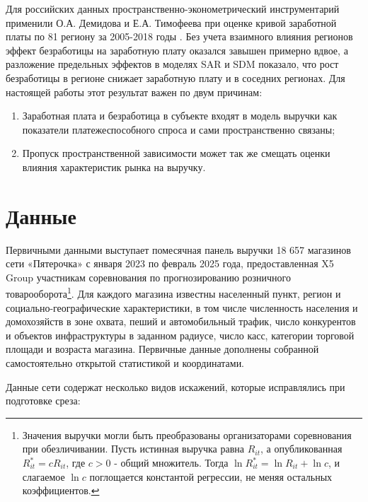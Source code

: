 \documentclass[12pt, a4paper]{article}
\begin{document}
Для российских данных пространственно-эконометрический инструментарий применили О.А. Демидова и
Е.А. Тимофеева при оценке кривой заработной платы по 81 региону за 2005-2018 годы
\cite{demidova2021}. Без учета взаимного влияния регионов эффект безработицы на заработную плату
оказался завышен примерно вдвое, а разложение предельных эффектов в моделях SAR и SDM показало,
что рост безработицы в регионе снижает заработную плату и в соседних регионах. Для настоящей
работы этот результат важен по двум причинам:

\begin{enumerate}
    \item Заработная плата и безработица в субъекте входят в модель выручки как показатели
    платежеспособного спроса и сами пространственно связаны;
    \item Пропуск пространственной зависимости может так же смещать оценки влияния
    характеристик рынка на выручку.
\end{enumerate}

\clearpage

\section*{Данные}

Первичными данными выступает помесячная панель выручки 18 657 магазинов сети «Пятерочка» с
января 2023 по февраль 2025 года, предоставленная X5 Group участникам соревнования по
прогнозированию розничного товарооборота\footnote{Значения выручки могли быть преобразованы
организаторами соревнования при обезличивании. Пусть истинная выручка равна $R_{it}$, а
опубликованная $R^{*}_{it} = c R_{it}$, где $c > 0$ - общий множитель. Тогда
$\ln R^{*}_{it} = \ln R_{it} + \ln c$, и слагаемое $\ln c$ поглощается константой регрессии, не
меняя остальных коэффициентов.}. Для каждого магазина известны населенный пункт, регион и
социально-географические характеристики, в том числе численность населения и домохозяйств в зоне
охвата, пеший и автомобильный трафик, число конкурентов и объектов инфраструктуры в заданном
радиусе, число касс, категории торговой площади и возраста магазина. Первичные данные дополнены собранной
самостоятельно открытой статистикой и координатами.

Данные сети содержат несколько видов искажений, которые исправлялись при подготовке среза:
\end{document}
